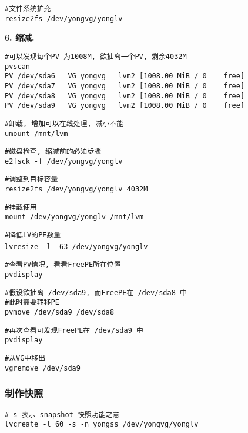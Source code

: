 \par
\qquad\verb"#文件系统扩充"\\
\indent\texttt{\qquad resize2fs /dev/yongvg/yonglv}

\par
\textbf{6. 缩减.} 
\par
\qquad\verb"#可以发现每个PV 为1008M, 欲抽离一个PV, 剩余4032M"\\
\indent\texttt{\qquad pvscan}\\
\indent\qquad\qquad\verb"PV /dev/sda6   VG yongvg   lvm2 [1008.00 MiB / 0    free]"\\
\indent\qquad\qquad\verb"PV /dev/sda7   VG yongvg   lvm2 [1008.00 MiB / 0    free]"\\
\indent\qquad\qquad\verb"PV /dev/sda8   VG yongvg   lvm2 [1008.00 MiB / 0    free]"\\
\indent\qquad\qquad\verb"PV /dev/sda9   VG yongvg   lvm2 [1008.00 MiB / 0    free]"

\par
\qquad\verb"#卸载, 增加可以在线处理, 减小不能"\\
\indent\texttt{\qquad umount /mnt/lvm}

\par
\qquad\verb"#磁盘检查, 缩减前的必须步骤"\\
\indent\texttt{\qquad e2fsck -f /dev/yongvg/yonglv}

\par
\qquad\verb"#调整到目标容量"\\
\indent\texttt{\qquad resize2fs /dev/yongvg/yonglv 4032M} 

\par
\qquad \verb"#挂载使用" \\
\indent\qquad \verb"mount /dev/yongvg/yonglv /mnt/lvm"

\par
\qquad \verb"#降低LV的PE数量" \\
\indent\texttt{\qquad lvresize -l -63 /dev/yongvg/yonglv}\

\par
\qquad \verb"#查看PV情况, 看看FreePE所在位置" \\
\indent\texttt{\qquad pvdisplay}

\par
\qquad \verb"#假设欲抽离 /dev/sda9, 而FreePE在 /dev/sda8 中"\\
\indent\qquad \verb"#此时需要转移PE" \\
\indent\texttt{\qquad pvmove /dev/sda9 /dev/sda8}

\par
\qquad \verb"#再次查看可发现FreePE在 /dev/sda9 中" \\
\indent\texttt{\qquad pvdisplay}

\par
\qquad \verb"#从VG中移出" \\
\indent\texttt{\qquad vgremove /dev/sda9}

\subsubsection{制作快照}
\par
\qquad \verb"#-s 表示 snapshot 快照功能之意" \\
\indent\texttt{\qquad lvcreate -l 60 -s -n yongss /dev/yongvg/yonglv}

